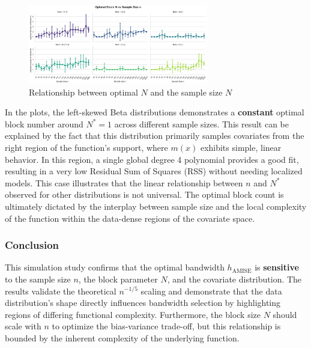 \documentclass{article}
\begin{document}
\begin{figure}[H]
\centering
\includegraphics[width=0.7\textwidth]{plot4_block_vs_n.png}
\caption{Relationship between optimal $N$ and the sample size $N$}
\label{fig:Nvsn}
\end{figure}
In the plots, the left-skewed Beta distributions demonstrates a \textbf{constant} optimal block number around $N^* = 1$ across different sample sizes. This result can be explained by the fact that this distribution primarily samples covariates from 
the right region of the function's support, where $m(x)$ exhibits simple, linear behavior. 
In this region, a single global degree 4 polynomial provides a good fit, resulting in a very low Residual Sum of Squares (RSS) without needing localized models. 
This case illustrates that the linear relationship between $n$ and $N^*$ observed for other distributions is not universal. 
The optimal block count is ultimately dictated by the interplay between sample size and the local complexity of the function within the data-dense regions of the covariate space.

\subsubsection*{Conclusion}
This simulation study confirms that the optimal bandwidth $h_{\text{AMISE}}$ is \textbf{sensitive} to the sample size $n$, the block parameter $N$, and the covariate distribution. 
The results validate the theoretical $n^{-1/5}$ scaling and demonstrate that the data distribution's shape directly influences bandwidth selection by highlighting regions of differing functional complexity. 
Furthermore, the block size $N$ should scale with $n$ to optimize the bias-variance trade-off, but this relationship is bounded by the inherent complexity of the underlying function.
\end{document}
